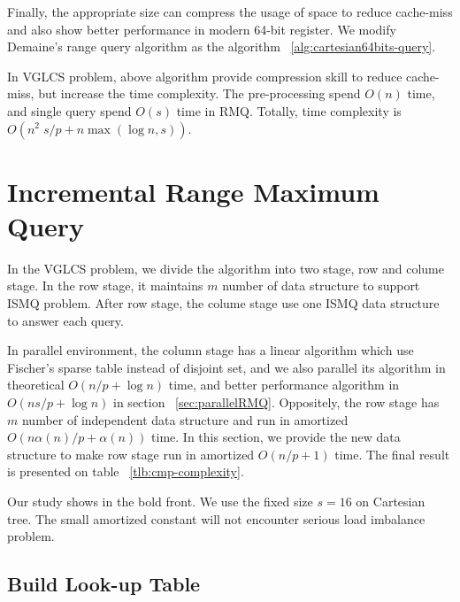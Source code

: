 Finally, the appropriate size can compress the usage of space to
reduce cache-miss and also show better performance in modern 64-bit
register.  We modify Demaine's range query algorithm as the algorithm
~\ref{alg:cartesian64bits-query}.





In VGLCS problem, above algorithm provide compression skill to reduce
cache-miss, but increase the time complexity.  The pre-processing
spend $O(n)$ time, and single query spend $O(s)$ time in RMQ.
Totally, time complexity is $O(n^2 \; s / p + n \max(\log n, s))$.


\section{Incremental Range Maximum Query}

In the VGLCS problem, we divide the algorithm into two stage, row and
colume stage.  In the row stage, it maintains $m$ number of data
structure to support ISMQ problem.  After row stage, the colume stage
use one ISMQ data structure to answer each query.

In parallel environment, the column stage has a linear algorithm which
use Fischer's sparse table instead of disjoint set, and we also
parallel its algorithm in theoretical $O(n / p + \log n)$ time, and
better performance algorithm in $O(n s / p + \log n)$ in section
~\ref{sec:parallelRMQ}.  Oppositely, the row stage has $m$ number of
independent data structure and run in amortized $O(n \alpha(n) / p +
\alpha(n))$ time.  In this section, we provide the new data structure
to make row stage run in amortized $O(n / p + 1)$ time.  The final
result is presented on table ~\ref{tlb:cmp-complexity}.

\begin{table*}
  \centering
  

  \caption{   Our study shows in the bold front. We use the fixed size
$s=16$ on Cartesian tree. The small amortized constant will not
encounter serious load imbalance problem.   }

  \label{tlb:cmp-complexity}
\end{table*}

\subsection{Build Look-up Table}

